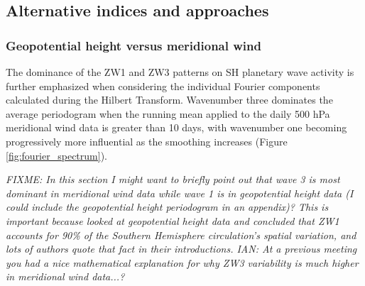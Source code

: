 \subsection{Alternative indices and approaches}

\subsubsection{Geopotential height versus meridional wind}

The dominance of the ZW1 and ZW3 patterns on SH planetary wave activity is further emphasized when considering the individual Fourier components calculated during the Hilbert Transform. Wavenumber three dominates the average periodogram when the running mean applied to the daily 500 hPa meridional wind data is greater than 10 days, with wavenumber one becoming progressively more influential as the smoothing increases (Figure \ref{fig:fourier_spectrum}).


\textit{FIXME: In this section I might want to briefly point out that wave 3 is most dominant in meridional wind data while wave 1 is in geopotential height data (I could include the geopotential height periodogram in an appendix)? This is important because \citet{vanLoon1972} looked at geopotential height data and concluded that ZW1 accounts for 90\% of the Southern Hemisphere circulation's spatial variation, and lots of authors quote that fact in their introductions. IAN: At a previous meeting you had a nice mathematical explanation for why ZW3 variability is much higher in meridional wind data...? }